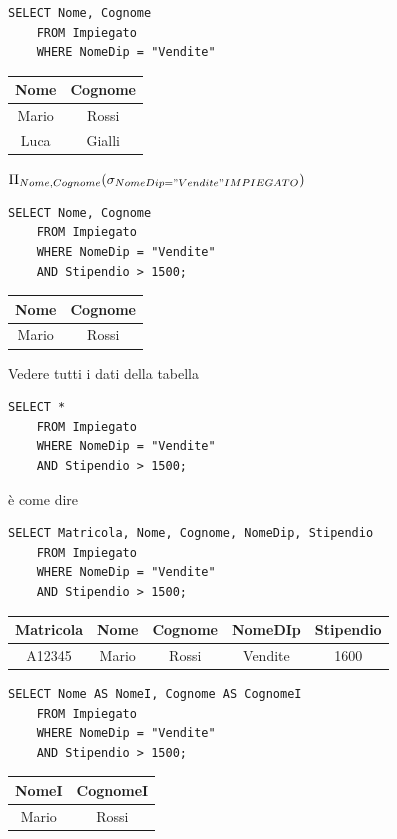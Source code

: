 \documentclass{article}
\begin{document}
\begin{itemize}
\begin{lstlisting}[style=sqlstyle]
	SELECT Nome, Cognome
	FROM Impiegato
	WHERE NomeDip = "Vendite"
\end{lstlisting}

\begin{tabular}{|c|c|}
	\hline
	\textbf{Nome} & \textbf{Cognome} \\
	\hline
	Mario & Rossi \\
	\hline
	Luca & Gialli \\
	\hline
\end{tabular}

$\Pi_{Nome,Cognome}(\sigma_{NomeDip = "Vendite" IMPIEGATO})$


\begin{lstlisting}[style=sqlstyle]
	SELECT Nome, Cognome
	FROM Impiegato
	WHERE NomeDip = "Vendite"
	AND Stipendio > 1500;
\end{lstlisting}

\begin{tabular}{|c|c|}
	\hline
	\textbf{Nome} & \textbf{Cognome} \\
	\hline
	Mario & Rossi \\
	\hline
\end{tabular}

Vedere tutti i dati della tabella
\begin{lstlisting}[style=sqlstyle]
	SELECT *
	FROM Impiegato
	WHERE NomeDip = "Vendite"
	AND Stipendio > 1500;
\end{lstlisting}

è come dire 

\begin{lstlisting}[style=sqlstyle]
	SELECT Matricola, Nome, Cognome, NomeDip, Stipendio
	FROM Impiegato
	WHERE NomeDip = "Vendite"
	AND Stipendio > 1500;
\end{lstlisting}

\begin{tabular}{|c|c|c|c|c|}
	\hline
	\textbf{Matricola} & \textbf{Nome} & \textbf{Cognome} & \textbf{NomeDIp} & \textbf{Stipendio} \\
	\hline
	A12345 & Mario & Rossi & Vendite & 1600 \\
	\hline
\end{tabular}

\begin{lstlisting}[style=sqlstyle]
	SELECT Nome AS NomeI, Cognome AS CognomeI
	FROM Impiegato
	WHERE NomeDip = "Vendite"
	AND Stipendio > 1500;
\end{lstlisting}


\begin{tabular}{|c|c|}
	\hline
	\textbf{NomeI} & \textbf{CognomeI} \\
	\hline
	Mario & Rossi \\
	\hline
\end{tabular}


\end{itemize}
\end{document}
